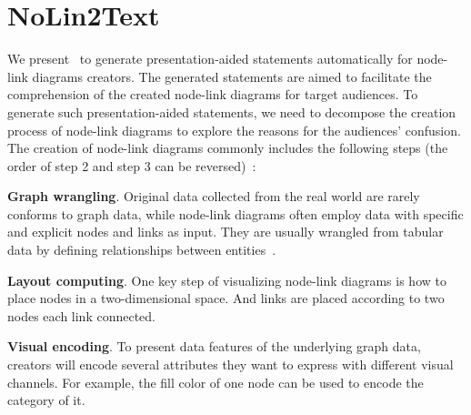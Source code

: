 \section{NoLin2Text}
We present \ApproachName~to generate presentation-aided statements automatically for node-link diagrams creators. The generated statements are aimed to facilitate the comprehension of the created node-link diagrams for target audiences.
To generate such presentation-aided statements, we need to decompose the creation process of node-link diagrams to explore the reasons for the audiences' confusion.
The creation of node-link diagrams commonly includes the following steps (the order of step 2 and step 3 can be reversed)~\cite{DBLP:journals/cgf/SpritzerBDFF15, tvcg/RomatAP21}:
\begin{compactenum}
    \item \textbf{Graph wrangling}. Original data collected from the real world are rarely conforms to graph data, while node-link diagrams often employ data with specific and explicit nodes and links as input. They are usually wrangled from tabular data by defining relationships between entities~\cite{DBLP:journals/tvcg/SrinivasanPEB18, DBLP:conf/ieeevast/BigelowNML19, DBLP:journals/ivs/HeerP14, DBLP:journals/ivs/LiuNS14}.
    \item \textbf{Layout computing}. One key step of visualizing node-link diagrams is how to place nodes in a two-dimensional space. And links are placed according to two nodes each link connected.
    \item \textbf{Visual encoding}. To present data features of the underlying graph data, creators will encode several attributes they want to express with different visual channels. For example, the fill color of one node can be used to encode the category of it.
\end{compactenum}

